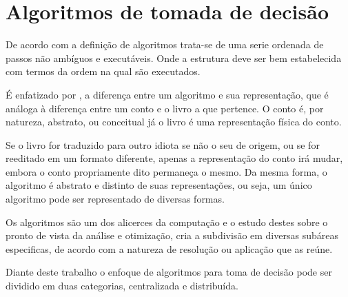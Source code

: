%

\section{Algoritmos de tomada de decisão}
\par
De acordo com \cite{BRO05} a definição de algoritmos trata-se de uma serie ordenada de passos não ambíguos e executáveis. Onde a estrutura deve ser bem estabelecida com termos da ordem na qual são executados.
\par
É enfatizado por \cite{BRO05}, a diferença entre um algoritmo e sua representação, que é análoga à diferença entre um conto e o livro a que pertence. O conto é, por natureza, abstrato, ou conceitual já o livro é uma representação física do conto. 
\par 
Se o livro for traduzido para outro idiota se não o seu de origem, ou se for reeditado em um formato diferente, apenas a representação do conto irá mudar, embora o conto propriamente dito permaneça o mesmo. Da mesma forma, o algoritmo é abstrato e distinto de suas representações, ou seja, um único algoritmo pode ser representado de diversas formas.
\par
Os algoritmos são um dos alicerces da computação e o estudo destes sobre o pronto de vista da análise e otimização, cria a subdivisão em diversas subáreas especificas, de acordo com a natureza de resolução ou aplicação que as reúne. 
\par
Diante deste trabalho o enfoque de algoritmos para toma de decisão pode ser dividido em duas categorias, centralizada e distribuída.
